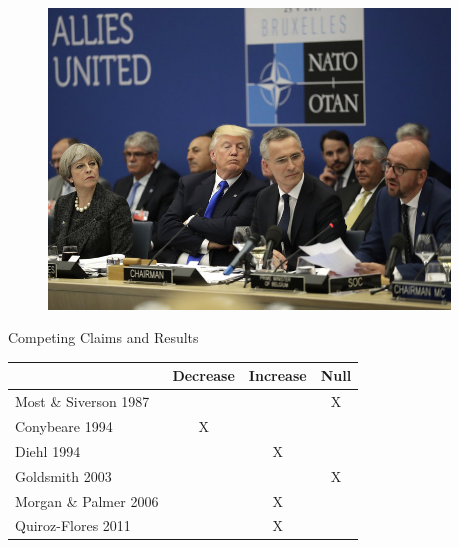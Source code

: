 \documentclass[12pt]{beamer}
\begin{document}

\begin{frame}[standout] 

\begin{figure}[htbp]
	\centering
		\includegraphics[width=0.95\textwidth]{trump-nato.jpg}
	\label{fig:trump-nato}
\end{figure}


\end{frame}
 




\begin{frame}{Competing Claims and Results}

\begin{table}[hbt!]
\begin{center}
\begin{tabular}{lccc}
     & Decrease & Increase & Null \\
\hline
Most \& Siverson 1987  &  &  & X \\
Conybeare 1994 & X & &  \\
Diehl 1994 &  & X &  \\
Goldsmith 2003 &  &  & X \\
Morgan \& Palmer 2006 &  & X & \\ 
Quiroz-Flores 2011 &  & X &  \\ 
\hline
\end{tabular}
\end{center} 
\end{table}


 \end{frame}
\end{document}

